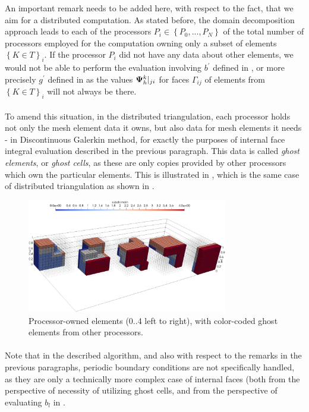 An important remark needs to be added here, with respect to the fact, that we aim for a distributed computation. As stated before, the domain decomposition approach leads to each of the processors $P_i \in \left\{P_0, ..., P_N\right\}$ of the total number of processors employed for the computation owning only a subset of elements $\left\{K \in T\right\}_i$. If the processor $P_i$ did not have any data about other elements, we would not be able to perform the evaluation involving $b^{'}$ defined in , or more precisely $g^{'}$ defined in  as the values ${\mathrm{\mathbf{\Psi}}_h^{k}}|_{ji}$ for faces $\Gamma_{ij}$ of elements from $\left\{K \in T\right\}_i$ will not always be there.
\paragraph{}
To amend this situation, in the distributed triangulation, each processor holds not only the mesh element data it owns, but also data for mesh elements it needs - in Discontinuous Galerkin method, for exactly the purposes of internal face integral evaluation described in the previous paragraph. This data is called \textit{ghost elements}, or \textit{ghost cells}, as these are only copies provided by other processors which own the particular elements. This is illustrated in , which is the same case of distributed triangulation as shown in .

\begin{figure}[H]
		\begin{center}
			\includegraphics[width=0.78\textwidth]{img/mesh/cube-NONperiodic,ghost.jpg}
			\vspace{-2mm}
		\caption{Processor-owned elements (0..4 left to right), with color-coded ghost elements from other processors.}
		\label{figure:ghost}
		\end{center}
	\end{figure}\vspace{-5mm}

\paragraph{}
Note that in the described algorithm, and also with respect to the remarks in the previous paragraphs, periodic boundary conditions are not specifically handled, as they are only a technically more complex case of internal faces (both from the perspective of necessity of utilizing ghost cells, and from the perspective of evaluating $b_{l}$ in .